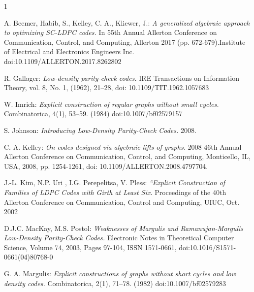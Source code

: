 \documentclass[leqno]{aadmbook}
\begin{document}
\begin{thebibliography}{1}


{\small {\sc A. Beemer, Habib, S., Kelley, C. A., Kliewer, J.: }{\it A generalized algebraic approach to optimizing SC-LDPC codes.} In 55th Annual Allerton Conference on Communication, Control, and Computing, Allerton 2017 (pp. 672-679).Institute of Electrical and Electronics Engineers Inc. doi:10.1109/ALLERTON.2017.8262802 }

{\small {\sc R. Gallager:} {\it Low-density parity-check codes.} IRE Transactions on Information Theory, vol. 8, No. 1, (1962), 21--28, doi: 10.1109/TIT.1962.1057683}

{\small {\sc W. Imrich: }{\it Explicit construction of regular graphs without small cycles.} Combinatorica, 4(1), 53–59. (1984) doi:10.1007/bf02579157 } 

{\small {\sc S. Johnson: }{\it Introducing Low-Density Parity-Check Codes.} 2008.}

{\small {\sc C. A. Kelley: }{\it On codes designed via algebraic lifts of graphs.} 2008 46th Annual Allerton Conference on Communication, Control, and Computing, Monticello, IL, USA, 2008, pp. 1254-1261, doi: 10.1109/ALLERTON.2008.4797704.}

{\small {\sc J.-L. Kim, N.P. Uri , I.G. Perepelitsa, V. Pless: }{\it “Explicit Construction of Families of LDPC Codes with Girth at Least Six.} Proceedings of the 40th Allerton Conference on Communication, Control and  Computing, UIUC, Oct. 2002}

{\small {\sc D.J.C. MacKay, M.S. Postol: }{\it Weaknesses of Margulis and Ramanujan-Margulis Low-Density Parity-Check Codes.} Electronic Notes in Theoretical Computer Science, Volume 74, 2003, Pages 97-104, ISSN 1571-0661, doi:10.1016/S1571-0661(04)80768-0}

{\small {\sc G. A. Margulis: }{\it Explicit constructions of graphs without short cycles and low density codes.} Combinatorica, 2(1), 71–78. (1982) doi:10.1007/bf02579283}


\end{thebibliography}
\end{document}
